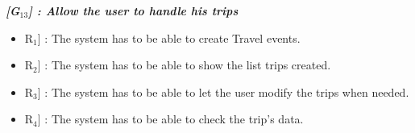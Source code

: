 \vspace{0.5cm}
\noindent
\emph{\textbf{[G$_{13}$] : Allow the user to handle his trips}}
\begin{itemize}
	\setlength{\leftskip}{0.5cm}
	\item \lbrack R$_{1}$] : The system has to be able to create Travel events.
	\item \lbrack R$_{2}$] : The system has to be able to show the list trips created.
	\item \lbrack R$_{3}$] : The system has to be able to let the user modify the trips when needed.
	\item \lbrack R$_{4}$] : The system has to be able to check the trip’s data.
\end{itemize}